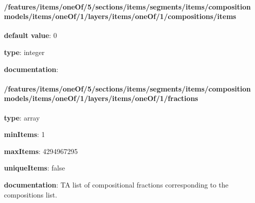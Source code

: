 \begin{itemized}
\paragraph{/features/items/oneOf/5/sections/items/segments/items/composition models/items/oneOf/1/layers/items/oneOf/1/compositions/items} \begin{itemized}
\item {\bf default value}: 0
\item {\bf type}: integer
\item {\bf documentation}: 
\end{itemized}\end{itemized}\paragraph{/features/items/oneOf/5/sections/items/segments/items/composition models/items/oneOf/1/layers/items/oneOf/1/fractions} \begin{itemized}
\item {\bf type}: array
\item {\bf minItems}: 1
\item {\bf maxItems}: 4294967295
\item {\bf uniqueItems}: false
\item {\bf documentation}: TA list of compositional fractions corresponding to the compositions list.

\end{itemized}
